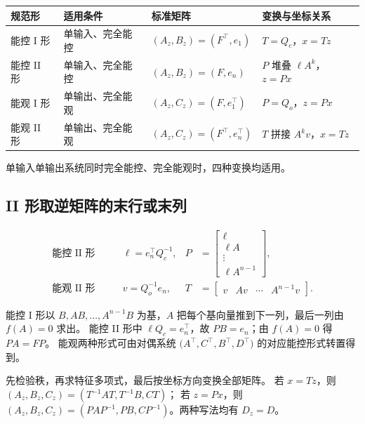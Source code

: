 \documentclass[UTF8,a4paper,12pt,fontset=fandol]{ctexart}
\begin{document}
\begin{center}
\renewcommand{\arraystretch}{1.25}
\begin{tabular}{@{}llll@{}}
\toprule
规范形 & 适用条件 & 标准矩阵 & 变换与坐标关系 \\
\midrule
能控 I 形 & 单输入、完全能控 & $(A_z,B_z)=(F^\top,e_1)$ & $T=Q_c$，$x=Tz$ \\
能控 II 形 & 单输入、完全能控 & $(A_z,B_z)=(F,e_n)$ & $P$ 堆叠 $\ell A^k$，$z=Px$ \\
能观 I 形 & 单输出、完全能观 & $(A_z,C_z)=(F,e_1^\top)$ & $P=Q_o$，$z=Px$ \\
能观 II 形 & 单输出、完全能观 & $(A_z,C_z)=(F^\top,e_n^\top)$ & $T$ 拼接 $A^k v$，$x=Tz$ \\
\bottomrule
\end{tabular}
\end{center}

单输入单输出系统同时完全能控、完全能观时，四种变换均适用。

\subsection*{ II 形取逆矩阵的末行或末列}

\[
\begin{aligned}
  \text{能控 II 形}\qquad
  &\ell=e_n^\top Q_c^{-1}, &
  P&=\begin{bmatrix}\ell\\\ell A\\\vdots\\\ell A^{n-1}\end{bmatrix},\\[4pt]
  \text{能观 II 形}\qquad
  &v=Q_o^{-1}e_n, &
  T&=\begin{bmatrix}v&Av&\cdots&A^{n-1}v\end{bmatrix}.
\end{aligned}
\]

能控 I 形以 $B,AB,\ldots,A^{n-1}B$ 为基，$A$ 把每个基向量推到下一列，最后一列由 $f(A)=0$ 求出。
能控 II 形中 $\ell Q_c=e_n^\top$，故 $PB=e_n$；由 $f(A)=0$ 得 $PA=FP$。
能观两种形式可由对偶系统 $\bigl(A^\top,C^\top,B^\top,D^\top\bigr)$ 的对应能控形式转置得到。

\begin{keybox}
先检验秩，再求特征多项式，最后按坐标方向变换全部矩阵。
若 $x=Tz$，则 $(A_z,B_z,C_z)=(T^{-1}AT,T^{-1}B,CT)$；
若 $z=Px$，则 $(A_z,B_z,C_z)=(PAP^{-1},PB,CP^{-1})$。两种写法均有 $D_z=D$。
\end{keybox}
\end{document}
